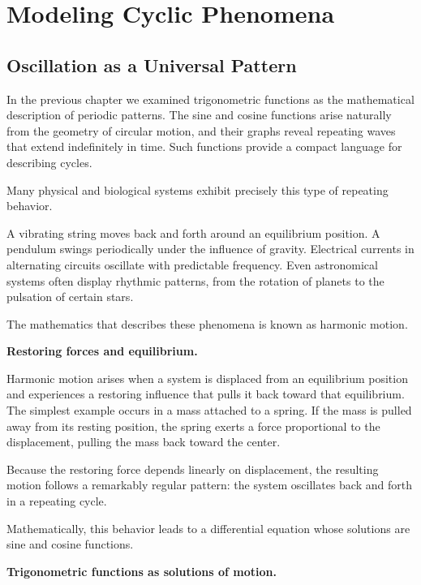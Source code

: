 \documentclass[11pt, openany]{book}
\theoremstyle{plain}
\theoremstyle{definition}
\theoremstyle{remark}
\begin{document}
\chapter{Modeling Cyclic Phenomena}

\section*{Oscillation as a Universal Pattern}

In the previous chapter we examined trigonometric functions as the
mathematical description of periodic patterns. The sine and cosine
functions arise naturally from the geometry of circular motion, and
their graphs reveal repeating waves that extend indefinitely in time.
Such functions provide a compact language for describing cycles.

Many physical and biological systems exhibit precisely this type of
repeating behavior.

A vibrating string moves back and forth around an equilibrium position.
A pendulum swings periodically under the influence of gravity. Electrical
currents in alternating circuits oscillate with predictable frequency.
Even astronomical systems often display rhythmic patterns, from the
rotation of planets to the pulsation of certain stars.

The mathematics that describes these phenomena is known as harmonic
motion.

\medskip

\textbf{Restoring forces and equilibrium.}

Harmonic motion arises when a system is displaced from an equilibrium
position and experiences a restoring influence that pulls it back toward
that equilibrium. The simplest example occurs in a mass attached to a
spring. If the mass is pulled away from its resting position, the spring
exerts a force proportional to the displacement, pulling the mass back
toward the center.

Because the restoring force depends linearly on displacement, the
resulting motion follows a remarkably regular pattern: the system
oscillates back and forth in a repeating cycle.

Mathematically, this behavior leads to a differential equation whose
solutions are sine and cosine functions.

\medskip

\textbf{Trigonometric functions as solutions of motion.}
\end{document}
